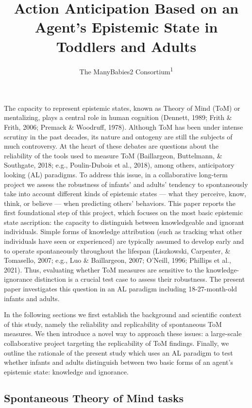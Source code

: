 \documentclass[
  english,
  man,floatsintext]{apa6}
\title{Action Anticipation Based on an Agent's Epistemic State in Toddlers and Adults}
\author{The ManyBabies2 Consortium\textsuperscript{1}}
\date{}
\affiliation{\vspace{0.5cm}\textsuperscript{1} See author note}
\begin{document}
\maketitle

The capacity to represent epistemic states, known as Theory of Mind (ToM) or mentalizing, plays a central role in human cognition (Dennett, 1989; Frith \& Frith, 2006; Premack \& Woodruff, 1978). Although ToM has been under intense scrutiny in the past decades, its nature and ontogeny are still the subjects of much controversy. At the heart of these debates are questions about the reliability of the tools used to measure ToM (Baillargeon, Buttelmann, \& Southgate, 2018; e.g., Poulin-Dubois et al., 2018), among others, anticipatory looking (AL) paradigms. To address this issue, in a collaborative long-term project we assess the robustness of infants' and adults' tendency to spontaneously take into account different kinds of epistemic states --- what they perceive, know, think, or believe --- when predicting others' behaviors. This paper reports the first foundational step of this project, which focuses on the most basic epistemic state ascription: the capacity to distinguish between knowledgeable and ignorant individuals. Simple forms of knowledge attribution (such as tracking what other individuals have seen or experienced) are typically assumed to develop early and to operate spontaneously throughout the lifespan (Liszkowski, Carpenter, \& Tomasello, 2007; e.g., Luo \& Baillargeon, 2007; O'Neill, 1996; Phillips et al., 2021). Thus, evaluating whether ToM measures are sensitive to the knowledge-ignorance distinction is a crucial test case to assess their robustness. The present paper investigates this question in an AL paradigm including 18-27-month-old infants and adults.

In the following sections we first establish the background and scientific context of this study, namely the reliability and replicability of spontaneous ToM measures. We then introduce a novel way to approach these issues: a large-scale collaborative project targeting the replicability of ToM findings. Finally, we outline the rationale of the present study which uses an AL paradigm to test whether infants and adults distinguish between two basic forms of an agent's epistemic state: knowledge and ignorance.

\hypertarget{spontaneous-theory-of-mind-tasks}{%
\subsection{Spontaneous Theory of Mind tasks}\label{spontaneous-theory-of-mind-tasks}}
\end{document}
